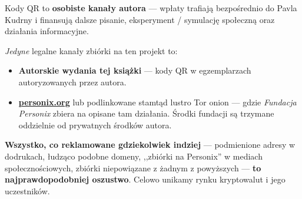 \begin{minipage}[t]{0.60\textwidth}
\vspace{0pt}
\begin{mdframed}[
  linewidth=0.7pt,roundcorner=5pt,
  innerleftmargin=10pt,innerrightmargin=10pt,
  innertopmargin=8pt,innerbottommargin=8pt,
  skipabove=0pt,skipbelow=0pt,
  linecolor=cbwarning!50,backgroundcolor=cbwarning!5,
  nobreak=true,
  needspace=4\baselineskip,
]
\footnotesize
Kody QR to \textbf{osobiste kanały autora} --- wpłaty trafiają bezpośrednio do Pavla Kudrny i finansują dalsze pisanie, eksperyment / symulację społeczną oraz działania informacyjne.

\smallskip
\emph{Jedyne} legalne kanały zbiórki na ten projekt to:

\smallskip
\begin{itemize}
\setlength{\itemsep}{0pt}
\setlength{\topsep}{0pt}
\item \textbf{Autorskie wydania tej książki} --- kody QR w egzemplarzach autoryzowanych przez autora.
\item \href{https://personix.org}{\textbf{personix.org}} lub podlinkowane stamtąd lustro Tor onion --- gdzie \emph{Fundacja Personix} zbiera na opisane tam działania. Środki fundacji są trzymane oddzielnie od prywatnych środków autora.
\end{itemize}

\smallskip
\textbf{Wszystko, co reklamowane gdziekolwiek indziej} --- podmienione adresy w dodrukach, łudząco podobne domeny, ,,zbiórki na Personix'' w mediach społecznościowych, zbiórki niepowiązane z żadnym z powyższych --- \textbf{to najprawdopodobniej oszustwo}. Celowo unikamy rynku kryptowalut i jego uczestników.
\end{mdframed}
\end{minipage}

\clearpage
